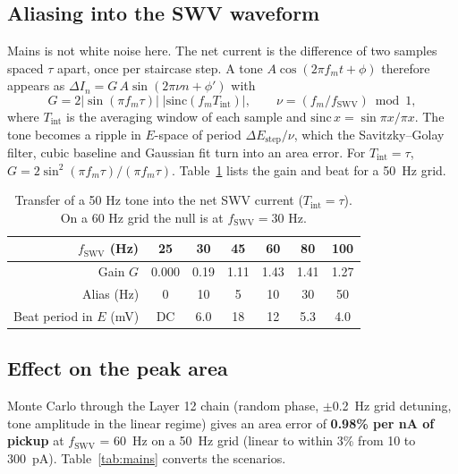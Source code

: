 \documentclass[10pt]{article}
\numberwithin{equation}{section}
\begin{document}
\subsection{Aliasing into the SWV waveform}
Mains is not white noise here. The net current is the difference of two samples spaced $\tau$ apart, once per staircase step. A tone $A\cos(2\pi f_mt + \phi)$ therefore appears as
$\Delta I_n = G\,A\sin(2\pi\nu n + \phi')$ with
\begin{equation}
G = 2\left|\sin(\pi f_m\tau)\right|\;\left|\mathrm{sinc}(f_mT_{\text{int}})\right|, \qquad
\nu = (f_m/f_{\text{SWV}}) \bmod 1 ,
\end{equation}
where $T_{\text{int}}$ is the averaging window of each sample and $\mathrm{sinc}\,x = \sin\pi x/\pi x$. The tone becomes a ripple in $E$-space of period $\Delta E_{\text{step}}/\nu$, which
the Savitzky--Golay filter, cubic baseline and Gaussian fit turn into an area error. For $T_{\text{int}} = \tau$, $G = 2\sin^2(\pi f_m\tau)/(\pi f_m\tau)$.
Table~\ref{tab:transfer} lists the gain and beat for a 50~Hz grid.

\begin{table}[h]
\centering\small
\begin{tabular}{@{}rcccccc@{}}
\toprule
$f_{\text{SWV}}$ (Hz) & 25 & 30 & 45 & 60 & 80 & 100 \\
\midrule
Gain $G$ & 0.000 & 0.19 & 1.11 & 1.43 & 1.41 & 1.27 \\
Alias (Hz) & 0 & 10 & 5 & 10 & 30 & 50 \\
Beat period in $E$ (mV) & DC & 6.0 & 18 & 12 & 5.3 & 4.0 \\
\bottomrule
\end{tabular}
\caption{Transfer of a 50 Hz tone into the net SWV current ($T_{\text{int}}=\tau$). On a 60 Hz grid the null is at $f_{\text{SWV}} = 30$ Hz.}\label{tab:transfer}
\end{table}

\subsection{Effect on the peak area}
Monte Carlo through the Layer 12 chain (random phase, $\pm$0.2~Hz grid detuning, tone amplitude in the linear regime) gives an area error of \textbf{0.98\% per nA of pickup} at
$f_{\text{SWV}}$ = 60~Hz on a 50~Hz grid (linear to within 3\% from 10 to 300~pA). Table~\ref{tab:mains} converts the scenarios.
\end{document}
